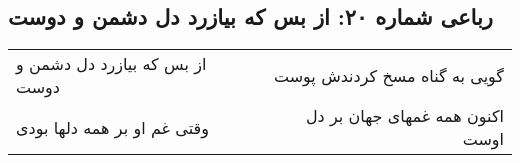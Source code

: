 \begin{center}
\section*{رباعی شماره ۲۰: از بس که بیازرد دل دشمن و دوست}
\label{sec:020}
\begin{longtable}{l p{0.5cm} r}
از بس که بیازرد دل دشمن و دوست
&&
گویی به گناه مسخ کردندش پوست
\\
وقتی غم او بر همه دلها بودی
&&
اکنون همه غمهای جهان بر دل اوست
\\
\end{longtable}
\end{center}
